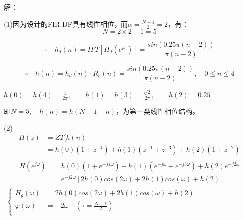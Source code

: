 \documentclass[notheorems,compress,mathserif,table]{beamer}
\begin{document}
\begin{frame}[allowframebreaks]\frametitle{}%
\par 解：\par
     \par (1)因为设计的FIR-DF具有线性相位，而$\alpha = \frac{N-1}{2}=2$，有：
             $$N=2\times2+1 = 5$$

             $$\therefore\quad
             h_d(n) = IFT[H_d(e^{j\omega})]=\frac{sin(0.25\pi(n-2))}{\pi(n-2)}$$

             $$\therefore\quad  h(n)=h_d(n)\cdot R_5(n)
             =\frac{sin(0.25\pi(n-2))}{\pi(n-2)},\quad 0\leqslant n\leqslant 4$$

             $h(0)=h(4) = \frac{1}{2\pi},\quad\quad h(1)=h(3)= \frac{\sqrt{2}}{2\pi},\quad\quad h(2) = 0.25$
     \par 即$N=5,\quad h(n)=h(N-1-n)$，为第一类线性相位结构。
     \newpage
     \par (2)
      \begin{equation*}
            \begin{split}
            H(z)
              &= ZT[h(n)\\
              &= h(0)(1+z^{-4}) +h(1)(z^{-1}+z^{-3})+h(2)(1+z^{-2})\\
            \end{split}
     \end{equation*}
     \begin{equation*}
            \begin{split}
            H(e^{j\omega})
              &= h(0)(1+e^{-j4\omega})+ h(1)(e^{-j\omega}+e^{-j3\omega})
                 +h(2)e^{-j2\omega}\\
              &= e^{-j2\omega}[2h(0)cos(2\omega)+2h(1)cos(\omega)+h(2)]\\
            \end{split}
     \end{equation*}
     $$
            \left\{ \begin{aligned}
              H_g(\omega)
                    &=2h(0)cos(2\omega)+2h(1)cos(\omega)+h(2)
                    \quad\quad\quad\quad\quad\quad\quad\quad\\
              \varphi(\omega)
                    &=-2\omega\quad(\tau = \frac{N-1}{2})\\
            \end{aligned} \right.
$$
\end{frame}
\end{document}
